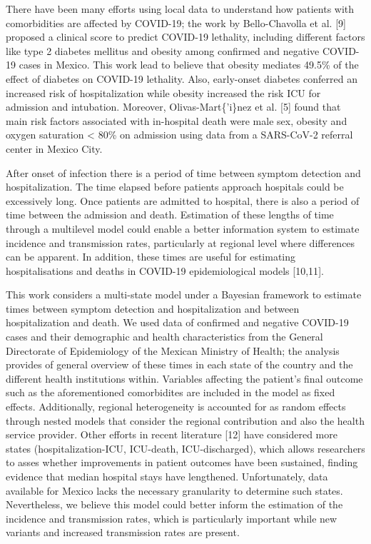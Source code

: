\documentclass[10pt,letterpaper]{article}
\begin{document}
There have been many efforts using local data to understand how patients
with comorbidities are affected by COVID-19; the work by Bello-Chavolla
et al. {[}9{]} proposed a clinical score to predict COVID-19 lethality,
including different factors like type 2 diabetes mellitus and obesity
among confirmed and negative COVID-19 cases in Mexico. This work lead to
believe that obesity mediates 49.5\% of the effect of diabetes on
COVID-19 lethality. Also, early-onset diabetes conferred an increased
risk of hospitalization while obesity increased the risk ICU for
admission and intubation. Moreover, Olivas-Mart\{'i\}nez et al. {[}5{]}
found that main risk factors associated with in-hospital death were male
sex, obesity and oxygen saturation \textless{} 80\% on admission using
data from a SARS-CoV-2 referral center in Mexico City.

After onset of infection there is a period of time between symptom
detection and hospitalization. The time elapsed before patients approach
hospitals could be excessively long. Once patients are admitted to
hospital, there is also a period of time between the admission and
death. Estimation of these lengths of time through a multilevel model
could enable a better information system to estimate incidence and
transmission rates, particularly at regional level where differences can
be apparent. In addition, these times are useful for estimating
hospitalisations and deaths in COVID-19 epidemiological models
{[}10,11{]}.

This work considers a multi-state model under a Bayesian framework to
estimate times between symptom detection and hospitalization and between
hospitalization and death. We used data of confirmed and negative
COVID-19 cases and their demographic and health characteristics from the
General Directorate of Epidemiology of the Mexican Ministry of Health;
the analysis provides of general overview of these times in each state
of the country and the different health institutions within. Variables
affecting the patient's final outcome such as the aforementioned
comorbidites are included in the model as fixed effects. Additionally,
regional heterogeneity is accounted for as random effects through nested
models that consider the regional contribution and also the health
service provider. Other efforts in recent literature {[}12{]} have
considered more states (hospitalization-ICU, ICU-death, ICU-discharged),
which allows researchers to asses whether improvements in patient
outcomes have been sustained, finding evidence that median hospital
stays have lengthened. Unfortunately, data available for Mexico lacks
the necessary granularity to determine such states. Nevertheless, we
believe this model could better inform the estimation of the incidence
and transmission rates, which is particularly important while new
variants and increased transmission rates are present.
\end{document}
